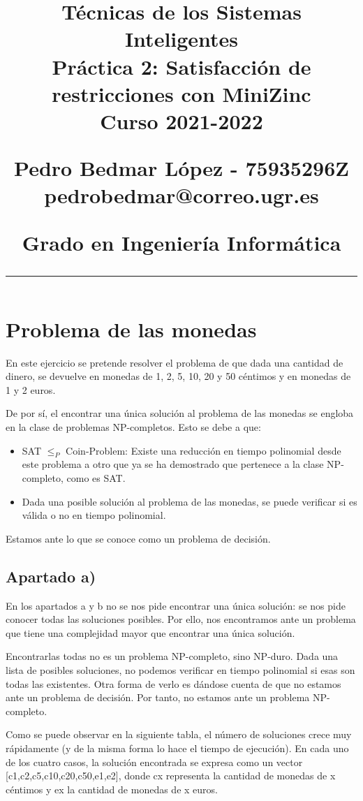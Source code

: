 \documentclass[12pt]{article} %
\title{	

\vspace{-2.5cm}
\LARGE \textbf{Técnicas de los Sistemas Inteligentes} \\
\LARGE Práctica 2: Satisfacción de restricciones con MiniZinc \\[0.5em]
\large Curso 2021-2022 \par
\large Pedro Bedmar López - 75935296Z \\
\normalsize pedrobedmar@correo.ugr.es \par
\large Grado en Ingeniería Informática
\vspace{-7pt}
\rule{\textwidth}{0.4pt}
\vspace{-2cm}
}
\date{}
\begin{document}
\clearpage
\maketitle %

\section{Problema de las monedas}
En este ejercicio se pretende resolver el problema de que dada una cantidad de dinero, se devuelve en monedas de 1, 2, 5, 10, 20 y 50 céntimos y en monedas de 1 y 2 euros.

De por sí, el encontrar una única solución al problema de las monedas se engloba en la clase de problemas NP-completos. Esto se debe a que:
\begin{itemize}
    \item SAT $\leq_P$ Coin-Problem: Existe una reducción en tiempo polinomial desde este problema a otro que ya se ha demostrado que pertenece a la clase NP-completo, como es SAT.
    \item Dada una posible solución al problema de las monedas, se puede verificar si es válida o no en tiempo polinomial.
\end{itemize}
Estamos ante lo que se conoce como un problema de decisión.

\subsection{Apartado a)}

En los apartados a y b no se nos pide encontrar una única solución: se nos pide conocer todas las soluciones posibles. Por ello, nos encontramos ante un problema que tiene una complejidad mayor que encontrar una única solución.

Encontrarlas todas no es un problema NP-completo, sino NP-duro. Dada una lista de posibles soluciones, no podemos verificar en tiempo polinomial si esas son todas las existentes. Otra forma de verlo es dándose cuenta de que no estamos ante un problema de decisión. Por tanto, no estamos ante un problema NP-completo.

Como se puede observar en la siguiente tabla, el número de soluciones crece muy rápidamente (y de la misma forma lo hace el tiempo de ejecución). En cada uno de los cuatro casos, la solución encontrada se expresa como un vector [c1,c2,c5,c10,c20,c50,e1,e2], donde cx representa la cantidad de monedas de x céntimos y ex la cantidad de monedas de x euros.
\end{document}
